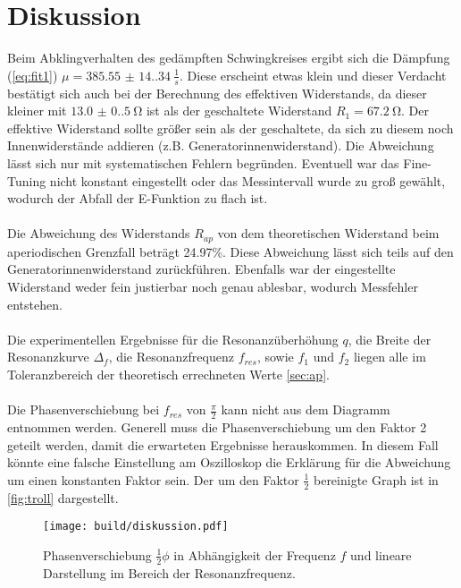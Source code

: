 \section{Diskussion}
\label{sec:Diskussion}
Beim Abklingverhalten des gedämpften Schwingkreises ergibt sich die Dämpfung (\autoref{eq:fit1}) 
$\mu = \SI{385.55(14.34)}{\frac{1}{s}}$. Diese erscheint etwas klein und dieser Verdacht
bestätigt sich auch bei der Berechnung des effektiven Widerstands, da dieser kleiner mit
$\SI{13.0(0.5)}{\ohm}$ ist als der geschaltete Widerstand $R_1 = \SI{67.2}{\ohm}$.
Der effektive Widerstand sollte größer sein als der geschaltete, da sich zu diesem noch
Innenwiderstände addieren (z.B. Generatorinnenwiderstand). Die Abweichung lässt sich nur mit
systematischen Fehlern begründen. Eventuell war das Fine-Tuning nicht konstant eingestellt
oder das Messintervall wurde zu groß gewählt, wodurch der Abfall der E-Funktion zu flach ist.
\\
\\
Die Abweichung des Widerstands $R_{ap}$ von dem theoretischen Widerstand beim aperiodischen
Grenzfall beträgt 24.97\%. Diese Abweichung lässt sich teils auf den Generatorinnenwiderstand
zurückführen. Ebenfalls war der eingestellte Widerstand weder fein justierbar noch genau ablesbar, 
wodurch Messfehler entstehen.
\\
\\
Die experimentellen Ergebnisse für die Resonanzüberhöhung $q$, die Breite der Resonanzkurve 
$\Delta_f$, die Resonanzfrequenz $f_{res}$, sowie $f_1$ und $f_2$ liegen alle im Toleranzbereich
der theoretisch errechneten Werte \autoref{sec:ap}.
\\
\\
Die Phasenverschiebung bei $f_{res}$ von $\frac{\pi}{2}$ kann nicht aus dem Diagramm entnommen werden.
Generell muss die Phasenverschiebung um den Faktor 2 geteilt werden, damit die erwarteten 
Ergebnisse herauskommen. In diesem Fall könnte eine falsche Einstellung am Oszilloskop
die Erklärung für die Abweichung um einen konstanten Faktor sein.
Der um den Faktor $\frac{1}{2}$ bereinigte Graph ist in \autoref{fig:troll} dargestellt.
\begin{figure}[H]
    \texttt{[image: build/diskussion.pdf]}
    \caption{Phasenverschiebung $\frac{1}{2}\phi$ in Abhängigkeit der Frequenz $f$ und lineare Darstellung im Bereich der Resonanzfrequenz.}
    \label{fig:troll}
  \end{figure}